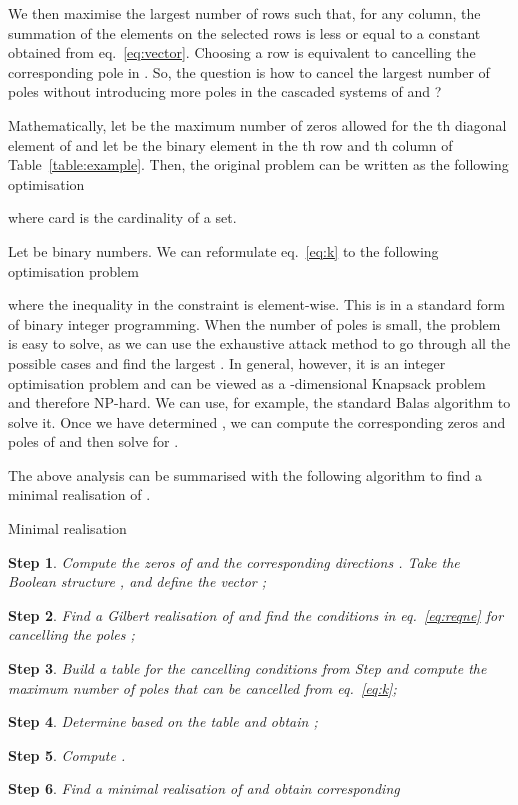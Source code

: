 \documentclass[twocolumn,12pt]{autart}
\theoremstyle{plain}
\newtheorem{step}{Step}
\begin{document}
We then maximise the largest number of rows such that, for any column, the summation of the elements on the selected rows is less or equal to a constant obtained from eq.~\eqref{eq:vector}. Choosing a row is equivalent to cancelling the corresponding pole in . So, the question is how to cancel the largest number of poles without introducing more poles in the cascaded systems of  and ?

Mathematically, let  be the maximum number of zeros allowed for the th diagonal element of  and let  be the binary element in the
th row and th column of Table~\ref{table:example}. Then, the original problem can be written as the following optimisation

where card is the cardinality of a set. 





Let  be binary numbers. We can reformulate eq.~\eqref{eq:k} to the following optimisation problem

where the inequality in the constraint is element-wise. This is in a standard form of binary integer programming. When the number of poles is small, the problem is easy to solve, as we can use the exhaustive attack method to go through all the possible cases and find the largest . In general, however, it is an integer optimisation problem and can be viewed as a -dimensional Knapsack problem and therefore NP-hard. We can use, for example, the standard Balas algorithm \cite{balas} to solve it. Once we have determined  , we can compute the corresponding zeros and poles of  and then solve for  .

The above analysis can be summarised with the following algorithm to find a minimal realisation of .
\begin{algorithm}[!]
\caption{Minimal  realisation}
\begin{step}
Compute the zeros  of  and the corresponding directions . Take the Boolean structure , and define the vector  ;
\end{step}
\begin{step}
Find a Gilbert realisation of  and find the conditions in eq.~\eqref{eq:reqne}
for cancelling the poles ;
\end{step}
\begin{step}
Build a table for the cancelling conditions from Step  and compute the maximum 
number of poles that can be cancelled from eq.~\eqref{eq:k};
\end{step}
\begin{step}
Determine  based on the table and obtain ;
\end{step}
\begin{step}
Compute .
\end{step}
\begin{step}
Find a minimal realisation of  and obtain corresponding  

\end{step}
\label{alg:iqpzero}
\end{algorithm}
\end{document}
